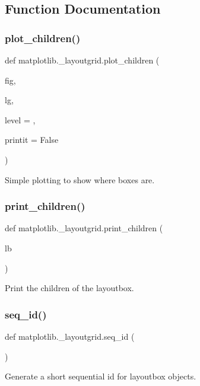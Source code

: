 \subsection{Function Documentation}
\mbox{\label{namespacematplotlib_1_1__layoutgrid_acda0f256a21eb2f7345b0ae77d98d11a}} 
\subsubsection{\texorpdfstring{plot\+\_\+children()}{plot\_children()}}
{\footnotesize\ttfamily def matplotlib.\+\_\+layoutgrid.\+plot\+\_\+children (\begin{DoxyParamCaption}\item[{}]{fig,  }\item[{}]{lg,  }\item[{}]{level = {},  }\item[{}]{printit = {\ttfamily False} }\end{DoxyParamCaption})}

\begin{DoxyVerb}Simple plotting to show where boxes are.\end{DoxyVerb}
 \mbox{\label{namespacematplotlib_1_1__layoutgrid_a3ca761132b41d5e09623ccb54c90fca5}} 
\subsubsection{\texorpdfstring{print\+\_\+children()}{print\_children()}}
{\footnotesize\ttfamily def matplotlib.\+\_\+layoutgrid.\+print\+\_\+children (\begin{DoxyParamCaption}\item[{}]{lb }\end{DoxyParamCaption})}

\begin{DoxyVerb}Print the children of the layoutbox.\end{DoxyVerb}
 \mbox{\label{namespacematplotlib_1_1__layoutgrid_a16fe697cb96f7405bd76e42425329895}} 
\subsubsection{\texorpdfstring{seq\+\_\+id()}{seq\_id()}}
{\footnotesize\ttfamily def matplotlib.\+\_\+layoutgrid.\+seq\+\_\+id (\begin{DoxyParamCaption}{ }\end{DoxyParamCaption})}

\begin{DoxyVerb}Generate a short sequential id for layoutbox objects.\end{DoxyVerb}
 